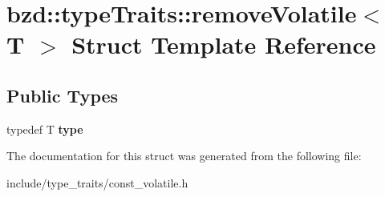 \hypertarget{structbzd_1_1typeTraits_1_1removeVolatile}{}\section{bzd\+:\+:type\+Traits\+:\+:remove\+Volatile$<$ T $>$ Struct Template Reference}
\label{structbzd_1_1typeTraits_1_1removeVolatile}
\subsection*{Public Types}
\begin{DoxyCompactItemize}
\item 
\mbox{\label{structbzd_1_1typeTraits_1_1removeVolatile_a64fe85b0c6fd7ed48b155cca7255f9fa}} 
typedef T {\bfseries type}
\end{DoxyCompactItemize}


The documentation for this struct was generated from the following file\+:\begin{DoxyCompactItemize}
\item 
include/type\+\_\+traits/const\+\_\+volatile.\+h\end{DoxyCompactItemize}

